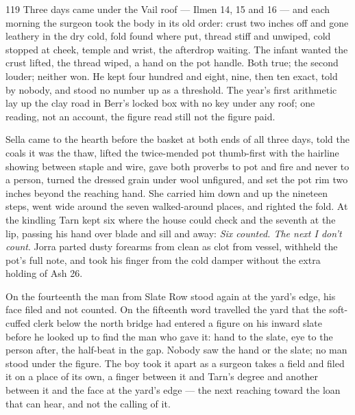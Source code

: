
\scenebreak


\scenebreak


\scenebreak

\CRtailpiece
\begin{CRchronicle}{119}
Three days came under the Vail roof — Ilmen 14, 15 and 16 — and each morning the surgeon took the body in its old order: crust two inches off and gone leathery in the dry cold, fold found where put, thread stiff and unwiped, cold stopped at cheek, temple and wrist, the afterdrop waiting. The infant wanted the crust lifted, the thread wiped, a hand on the pot handle. Both true; the second louder; neither won. He kept four hundred and eight, nine, then ten exact, told by nobody, and stood no number up as a threshold. The year’s first arithmetic lay up the clay road in Berr’s locked box with no key under any roof; one reading, not an account, the figure read still not the figure paid.

Sella came to the hearth before the basket at both ends of all three days, told the coals it was the thaw, lifted the twice-mended pot thumb-first with the hairline showing between staple and wire, gave both proverbs to pot and fire and never to a person, turned the dressed grain under wool unfigured, and set the pot rim two inches beyond the reaching hand. She carried him down and up the nineteen steps, went wide around the seven walked-around places, and righted the fold. At the kindling Tarn kept six where the house could check and the seventh at the lip, passing his hand over blade and sill and away: \emph{Six counted. The next I don’t count}. Jorra parted dusty forearms from clean as clot from vessel, withheld the pot’s full note, and took his finger from the cold damper without the extra holding of Ash 26.

On the fourteenth the man from Slate Row stood again at the yard’s edge, his face filed and not counted. On the fifteenth word travelled the yard that the soft-cuffed clerk below the north bridge had entered a figure on his inward slate before he looked up to find the man who gave it: hand to the slate, eye to the person after, the half-beat in the gap. Nobody saw the hand or the slate; no man stood under the figure. The boy took it apart as a surgeon takes a field and filed it on a place of its own, a finger between it and Tarn’s degree and another between it and the face at the yard’s edge — the next reaching toward the loan that can hear, and not the calling of it.


\end{CRchronicle}
